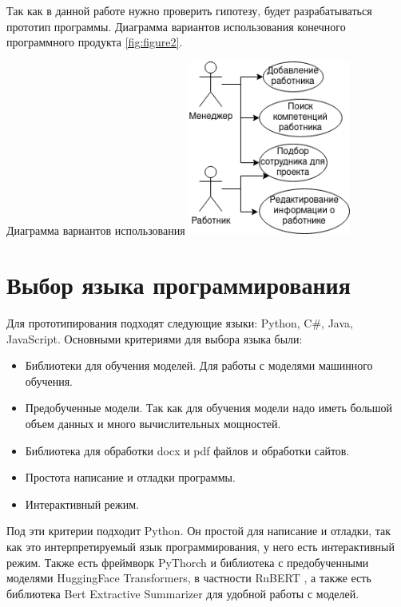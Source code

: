 \documentclass[PI,KR]{HSEUniversity}
\begin{document}
Так как в данной работе нужно проверить гипотезу, будет разрабатываться прототип программы. Диаграмма вариантов использования конечного программного продукта \ref{fig:figure2}.
\begin{FIGURE}[h]{Диаграмма вариантов использования \label{fig:figure2}}
	\includegraphics[width=0.4\textwidth]{img/Диаграмма вариантов использования}
\end{FIGURE}


\section{Выбор языка программирования}
Для прототипирования подходят следующие языки: Python, C\#, Java, JavaScript. Основными критериями для выбора языка были:
\begin{itemize}
	\item Библиотеки для обучения моделей. Для работы с моделями машинного обучения.
	\item Предобученные модели. Так как для обучения модели надо иметь большой объем данных и много вычислительных мощностей.
	\item Библиотека для обработки docx и pdf файлов и обработки сайтов.
	\item Простота написание и отладки программы.
	\item Интерактивный режим.
\end{itemize} 

Под эти критерии подходит Python. Он простой для написание и отладки, так как это интерпретируемый язык программирования, у него есть интерактивный режим. Также есть фреймворк PyThorch и библиотека с предобученными моделями HuggingFace Transformers, в частности RuBERT \cite{kuratov2019adaptation}, а также есть библиотека Bert Extractive Summarizer \cite{miller2019leveraging} для удобной работы с моделей.
\end{document}
